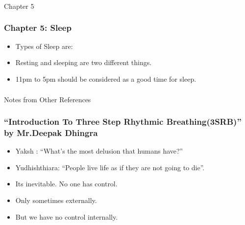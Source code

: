 \begin{frame}[fragile]\frametitle{}
\begin{center}
{\Large Chapter 5}
\end{center}
\end{frame}


\begin{frame}[fragile]
\frametitle{Chapter 5: Sleep}
\begin{itemize}
\item Types of Sleep are:

\item Resting and sleeping are two different things.
\item 11pm to 5pm should be considered as a good time for sleep.
\end{itemize}
\end{frame}


\begin{frame}[fragile]\frametitle{}
\begin{center}
{\Large Notes from Other References}
\end{center}
\end{frame}


\begin{frame}[fragile]
\frametitle{``Introduction To Three Step Rhythmic Breathing(3SRB)'' by Mr.Deepak Dhingra}


\begin{itemize}
\item Yaksh : ``What's the most delusion that humans have?''
\item Yudhishthiara: ``People live life as if they are not going to die''.
\item Its inevitable. No one has control. 
\item Only sometimes externally.
\item But we have no control internally. 
\end{itemize}
\end{frame}


